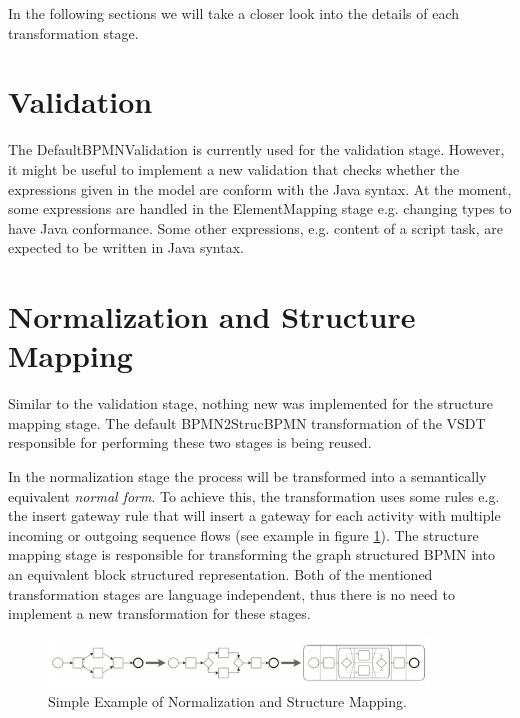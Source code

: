 In the following sections we will take a closer look into the details of each transformation stage.
\section{Validation}
The DefaultBPMNValidation is currently used for the validation stage. However, it might be useful to implement a new validation that checks whether the expressions given in the model are conform with the Java syntax. At the moment, some expressions are handled in the ElementMapping stage e.g. changing types to have Java conformance. Some other expressions, e.g. content of a script task, are expected to be written in Java syntax. 

\section{Normalization and Structure Mapping}
Similar to the validation stage, nothing new was implemented for the structure mapping stage. The default BPMN2StrucBPMN transformation  of the VSDT responsible for performing these two stages is being reused. 

In the normalization stage the process will be transformed into a semantically equivalent \textit{normal form}. To achieve this, the transformation uses some rules e.g. the insert gateway rule that will insert a gateway for each activity with multiple incoming or outgoing sequence flows (see example in figure \ref{fig:n+s}). The structure mapping stage is responsible for transforming the graph structured BPMN into an equivalent block structured representation. Both of the mentioned transformation stages are language independent, thus there is no need to implement a new transformation for these stages.

\begin{figure}[h]
	\centering	\includegraphics[width=0.9\textwidth]{images/structure_mapping.png}
	\caption{Simple Example of Normalization and Structure Mapping. \cite{TKAH08} }
	\label{fig:n+s}
\end{figure}


